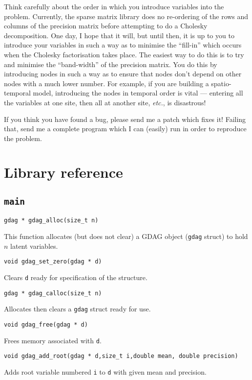 \documentclass[12pt,a4paper]{article}
\begin{document}
Think carefully about the order in which you introduce variables into
the problem. Currently, the sparse matrix library does no re-ordering
of the rows and columns of the precision matrix before attempting to
do a Cholesky decomposition. One day, I hope that it will, but until
then, it is up to you to introduce your variables in such a way as to
minimise the ``fill-in'' which occurs when the Cholesky factorisation
takes place. The easiest way to do this is to try and minimise the
``band-width'' of the precision matrix. You do this by introducing
nodes in such a way as to ensure that nodes don't depend on other nodes
with a much lower number. For example, if you are building a
spatio-temporal model, introducing the nodes in temporal order is
vital --- entering all the variables at one site, then all at
another site, \emph{etc.}, is disastrous!

If you think you have found a bug, please send me a patch which fixes
it! Failing that, send me a complete program which I can (easily) run
in order to reproduce the problem.

\section{Library reference}

\subsection{\texttt{main}} 

\begin{verbatim}
gdag * gdag_alloc(size_t n)
\end{verbatim}
This function allocates (but does not clear) a GDAG object (\verb$gdag$ struct) to
hold $n$ latent variables.

\begin{verbatim}
void gdag_set_zero(gdag * d)
\end{verbatim}
Clears \verb$d$ ready for specification of the structure.

\begin{verbatim}
gdag * gdag_calloc(size_t n)
\end{verbatim}
Allocates then clears a \verb$gdag$ struct ready for use.

\begin{verbatim}
void gdag_free(gdag * d)
\end{verbatim}
Frees memory associated with \verb$d$.

\begin{verbatim}
void gdag_add_root(gdag * d,size_t i,double mean, double precision)
\end{verbatim}
Adds root variable numbered \verb$i$ to \verb$d$ with given mean and
precision.
\end{document}
